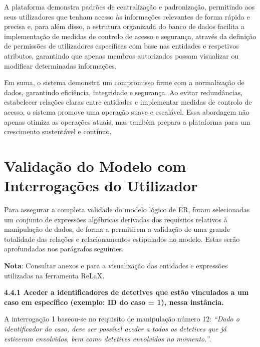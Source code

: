 \documentclass[a4paper,12pt]{scrreprt}
\begin{document}
        A plataforma demonstra padrões de centralização e padronização, permitindo aos seus utilizadores que tenham acesso às informações relevantes de forma rápida e precisa e, para além disso, a estrutura organizada do banco de dados facilita a implementação de medidas de controlo de acesso e segurança, através da definição de permissões de utilizadores específicas com base nas entidades e respetivos atributos, garantindo que apenas membros autorizados possam visualizar ou modificar determinadas informações.

        Em suma, o sistema demonstra um compromisso firme com a normalização de dados, garantindo eficiência, integridade e segurança. Ao evitar redundâncias, estabelecer relações claras entre entidades e implementar medidas de controlo de acesso, o sistema promove uma operação suave e escalável. Essa abordagem não apenas otimiza as operações atuais, mas também prepara a plataforma para um crescimento sustentável e contínuo.


    \clearpage
    \section{Validação do Modelo com Interrogações do Utilizador}
        \label{sec:val_model}
        
        Para assegurar a completa validade do modelo lógico de ER, foram selecionadas um conjunto de expressões algébricas derivadas dos requisitos relativos à manipulação de dados, de forma a permitirem a validação de uma grande totalidade das relações e relacionamentos estipulados no modelo. Estas serão aprofundadas nos parágrafos seguintes.

        \textbf{Nota}: Consultar anexos \textit{} e \textit{} para a visualização das entidades e expressões utilizadas na ferramenta ReLaX.

\clearpage

{\large\textbf{4.4.1 Aceder a identificadores de detetives que estão vinculados a um caso em específico (exemplo: ID do caso = 1), nessa instância.}}

\vspace{0.2cm}

A interrogação 1 baseou-se no requisito de manipulação número 12: \textit{“Dado o identificador do caso, deve ser possível aceder a todos os detetives que já estiveram envolvidos, bem como detetives envolvidos no momento.”}.
\end{document}
